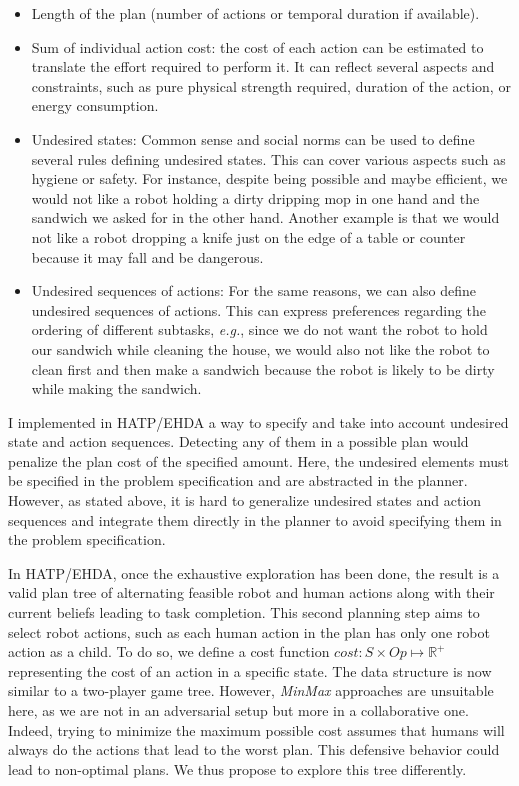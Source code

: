 \begin{itemize}
    \item Length of the plan (number of actions or temporal duration if available).
    \item Sum of individual action cost: the cost of each action can be estimated to translate the effort required to perform it. It can reflect several aspects and constraints, such as pure physical strength required, duration of the action, or energy consumption.
    \item Undesired states: Common sense and social norms can be used to define several rules defining undesired states. This can cover various aspects such as hygiene or safety. For instance, despite being possible and maybe efficient, we would not like a robot holding a dirty dripping mop in one hand and the sandwich we asked for in the other hand. Another example is that we would not like a robot dropping a knife just on the edge of a table or counter because it may fall and be dangerous. 
    \item Undesired sequences of actions: For the same reasons, we can also define undesired sequences of actions. This can express preferences regarding the ordering of different subtasks, \textit{e.g.}, since we do not want the robot to hold our sandwich while cleaning the house, we would also not like the robot to clean first and then make a sandwich because the robot is likely to be dirty while making the sandwich.  
\end{itemize}

I implemented in HATP/EHDA a way to specify and take into account undesired state and action sequences. Detecting any of them in a possible plan would penalize the plan cost of the specified amount. Here, the undesired elements must be specified in the problem specification and are abstracted in the planner. However, as stated above, it is hard to generalize undesired states and action sequences and integrate them directly in the planner to avoid specifying them in the problem specification.

In HATP/EHDA, once the exhaustive exploration has been done, the result is a valid plan tree of alternating feasible robot and human actions along with their current beliefs leading to task completion. This second planning step aims to select robot actions, such as each human action in the plan has only one robot action as a child.
To do so, we define a cost function $cost: S \times Op \mapsto \mathbb{R}^+$ representing the cost of an action in a specific state. The data structure is now similar to a two-player game tree. However, \textit{MinMax} approaches are unsuitable here, as we are not in an adversarial setup but more in a collaborative one. Indeed, trying to minimize the maximum possible cost assumes that humans will always do the actions that lead to the worst plan. This defensive behavior could lead to non-optimal plans. We thus propose to explore this tree differently.

